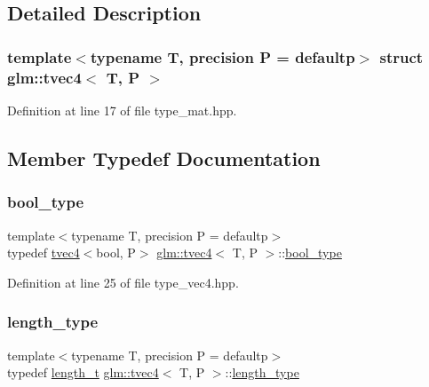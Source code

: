 \subsection{Detailed Description}
\subsubsection*{template$<$typename T, precision P = defaultp$>$\newline
struct glm\+::tvec4$<$ T, P $>$}



Definition at line 17 of file type\+\_\+mat.\+hpp.



\subsection{Member Typedef Documentation}
\mbox{\label{structglm_1_1tvec4_aace03487e0707681ffa197d4e844501b}} 
\subsubsection{\texorpdfstring{bool\_type}{bool\_type}}
{\footnotesize\ttfamily template$<$typename T, precision P = defaultp$>$ \\
typedef \mbox{\hyperlink{structglm_1_1tvec4}{tvec4}}$<$bool, P$>$ \mbox{\hyperlink{structglm_1_1tvec4}{glm\+::tvec4}}$<$ T, P $>$\+::\mbox{\hyperlink{structglm_1_1tvec4_aace03487e0707681ffa197d4e844501b}{bool\+\_\+type}}}



Definition at line 25 of file type\+\_\+vec4.\+hpp.

\mbox{\label{structglm_1_1tvec4_a4e2b34a427cac7e72b6f73173c206feb}} 
\subsubsection{\texorpdfstring{length\_type}{length\_type}}
{\footnotesize\ttfamily template$<$typename T, precision P = defaultp$>$ \\
typedef \mbox{\hyperlink{namespaceglm_a090a0de2260835bee80e71a702492ed9}{length\+\_\+t}} \mbox{\hyperlink{structglm_1_1tvec4}{glm\+::tvec4}}$<$ T, P $>$\+::\mbox{\hyperlink{structglm_1_1tvec4_a4e2b34a427cac7e72b6f73173c206feb}{length\+\_\+type}}}



